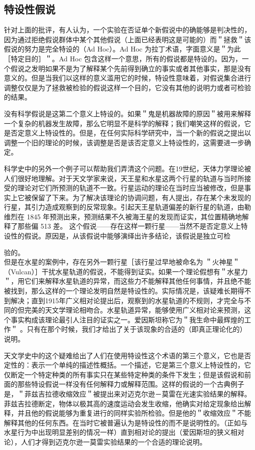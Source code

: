 \subsection{特设性假说}
针对上面的批评，有人认为，一个实验在否证单个新假说中的确能够是判决性的，因为通过拒绝假说群体中某个其他假说（上面已经表明这是可能的）而＂拯救＂该假说的努力是完全特设的（Ad Hoc）。Ad Hoc 为拉丁术语，字面意义是＂为此［特定目的］＂。Ad Hoc 包含这样一个意思，所有的假说都是特设的。因为，一个假说之发明如果不是为了解释某个先前得到确立的事实或者其他事实，那是没有意义的。但是当我们以这样的意义滥用它的时候，特设性意味着，对假说集合进行调整仅仅是为了拯救被检验的假说这样一个目的，它没有其他的说明力或者可检验的结果。

没有科学假说是这第二个意义上特设的。如果＂鬼是机器故障的原因＂被用来解释一个复杂的机器发生故障，那么它明显不是科学的解释；我们嘲笑这样的假说，它是否定意义上特设性的。但是，在任何实际科学研究中，当一个新的假说之提出以调整一个旧的理论的时候，该调整是否是该否定意义上特设性的，这需要进一步确定。

科学史中的另外一个例子可以帮助我们弄清这个问题。在19世纪，天体力学理论被人们很好地理解。对于天文学家来说，天王星和水星这两个行星的轨道与当时所接受的理论对它们所预测的轨道不一致。行星运动的理论在当时应当被修改，但是事实上它被保留了下来。为了解决该理论的协调问题，有人提出，存在某个未发现的行星，其引力造成观察到的反常现象。引起天王星轨道偏差的新行星的轨道，由勒维烈在 1845 年预测出来，预测结果不久被海王星的发现而证实，其位置精确地解释了那些偏 513 差。\cite{leverrier1992} 这个假说——存在这样一颗行星——当然不是否定意义上特设性的假说。原因是，从该假说中能够演绎出许多结论，该假说是独立可检

验的。\\
但是在水星的案例中，存在另外一颗行星［该行星过早地被命名为 ＂火神星＂（Vulcan）］干扰水星轨道的假说，不能得到证实。如果一个理论假想有＂水星力＂，用它们来解释水星轨道的异常，而这些力不能解释其他任何事情，并且绝不能被找到，那么这样的一个理论发明自然是特设性的。实际情况是，该疑难长期得不到解决；直到1915年广义相对论提出后，观察到的水星轨道的不规则，才完全与不同的但完美的天文学理论相吻合。水星轨道异常，能够使用广义相对论来预测，这个事实构成该理论最引人注目的证实之一。爱因斯坦称它为＂我生命中最辉煌的工作＂\cite{einstein1915} 。只有在那个时候，我们才给出了关于该现象的合适的（即真正理论化的）说明。

天文学史中的这个疑难给出了人们在使用特设性这个术语的第三个意义，它也是否定性的：表示一个单纯的描述性概括。一个描述，它是第三个意义上特设性的，它仅断定一个特定种类的所有事实只在某些特定种类的条件下发生；但是该假说和前面的那些特设假说一样没有任何解释力或解释范围。这样的假说的一个古典例子是，＂菲兹吉拉德收缩效应＂被提出来对迈克尔逊－莫雷在光速实验结果的解释。菲兹吉拉德断定，物体以极其高的速度运动会发生收缩，他确实对给定现象给出解释，并且他的假说能够为重复进行的同样实验所检验。但是他的＂收缩效应＂不能解释其他的任何东西。在当时它被普遍认为是特设性的而不是说明性的。（正如与水星行为中出现明显差别的情况一样）直到相对论的提出（爱因斯坦的狭义相对论），人们才得到迈克尔逊一莫雷实验结果的一个合适的理论说明。


